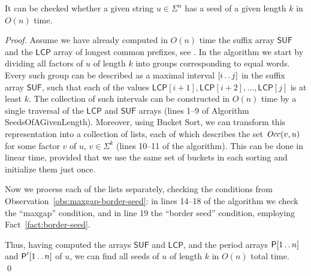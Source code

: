 \documentclass{llncs}
\newcommand{\SUF}{\textsf{SUF}}
\newcommand{\LCP}{\textsf{LCP}}
\newcommand{\Period}{\textsf{P}}
\newcommand{\Occ}{\mbox{\textit{Occ}}}
\def\dotdot{\mathinner{\ldotp\ldotp}}
\begin{document}
  \begin{theorem}\label{thm:seed-of-a-given-length}
    It can be checked whether a given string $u \in \Sigma^n$ has a seed of a given length $k$
    in $O(n)$ time.
  \end{theorem}
  \begin{proof}
    Assume we have already computed in $O(n)$ time the suffix array $\SUF$ and the $\LCP$ array
    of longest common prefixes, see \cite{AlgorithmsOnStrings}.
    In the algorithm we start by dividing all factors of $u$ of length $k$ into groups
    corresponding to equal words.
    Every such group can be described as a maximal interval $[i \dotdot j]$ in the suffix array
    $\SUF$, such that each of the values $\LCP[i+1],\LCP[i+2],\ldots,\LCP[j]$ is at least $k$.
    The collection of such intervals can be constructed in $O(n)$ time by a single traversal
    of the $\LCP$ and $\SUF$ arrays (lines 1--9 of Algorithm SeedsOfAGivenLength).
    Moreover, using Bucket Sort, we can transform this representation
    into a collection of lists, each of which describes the set $\Occ(v,u)$ 
    for some factor $v$ of $u$, $v \in \Sigma^k$ (lines 10--11 of the algorithm).
    This can be done in linear time, provided that we use the same set of buckets in 
    each sorting and initialize them just once.

    Now we process each of the lists separately, checking the conditions from
    Observation~\ref{obs:maxgap-border-seed}: in lines 14--18 of the algorithm we check the
    ``maxgap'' condition, and in line 19 the ``border seed'' condition, employing
    Fact~\ref{fact:border-seed}.

    Thus, having computed the arrays $\SUF$ and $\LCP$, and the period arrays 
    $\Period[1 \dotdot n]$ and $\Period'[1 \dotdot n]$ of $u$, 
    we can find all seeds of $u$ of length $k$ in $O(n)$ total time.
  \qed
  \end{proof}
\end{document}
